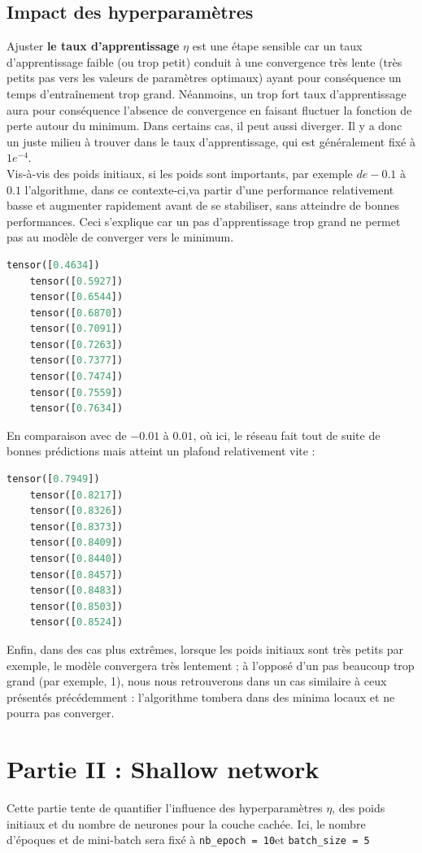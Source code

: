 \documentclass[a4paper]{article}
\newcommand{\code}[2]{\colorbox{light-gray}{\texttt{#1}}}
\begin{document}
	

		\subsection{Impact des hyperparamètres}
	Ajuster \textbf{le taux d'apprentissage} $\eta$ est une étape sensible car un taux d'apprentissage faible (ou trop petit) conduit à une convergence très lente (très petits pas vers les valeurs de paramètres optimaux) ayant pour conséquence un temps d'entraînement trop grand. Néanmoins, un trop fort taux d'apprentissage aura pour conséquence l'absence de convergence en faisant fluctuer la fonction de perte autour du minimum. Dans certains cas, il peut aussi diverger. Il y a donc un juste milieu à trouver dans le taux d'apprentissage, qui est généralement fixé à $1e^{-4}$.\\

Vis-à-vis des poids initiaux, si les poids sont importants, par exemple $de -0.1$ à $0.1$ l'algorithme, dans ce contexte-ci,va partir d'une performance relativement basse et augmenter rapidement avant de se stabiliser, sans atteindre de bonnes performances. Ceci s'explique car un pas d'apprentissage trop grand ne permet pas au modèle de converger vers le minimum. 
		\begin{lstlisting}[language=python]			
	tensor([0.4634])
	tensor([0.5927])
	tensor([0.6544])
	tensor([0.6870])
	tensor([0.7091])
	tensor([0.7263])
	tensor([0.7377])
	tensor([0.7474])
	tensor([0.7559])
	tensor([0.7634])
		\end{lstlisting} 
		
En comparaison avec de $-0.01$ à $0.01$, où ici, le réseau fait tout de suite de bonnes prédictions mais atteint un plafond relativement vite : 
		\begin{lstlisting}[language=python]			
	tensor([0.7949])
	tensor([0.8217])
	tensor([0.8326])
	tensor([0.8373])
	tensor([0.8409])
	tensor([0.8440])
	tensor([0.8457])
	tensor([0.8483])
	tensor([0.8503])
	tensor([0.8524])
		\end{lstlisting} 

Enfin, dans des cas plus extrêmes, lorsque les poids initiaux sont très petits par exemple, le modèle convergera très lentement ; à l'opposé d'un pas beaucoup trop grand (par exemple, 1), nous nous retrouverons dans un cas similaire à ceux présentés précédemment : l'algorithme tombera dans des minima locaux et ne pourra pas converger.


	\section*{Partie II : Shallow network}
	Cette partie tente de quantifier l'influence des hyperparamètres $\eta$, des poids initiaux et du nombre de neurones pour la couche cachée. Ici, le nombre d'époques et de mini-batch sera fixé à \code{nb\_epoch = 10}\ et \code{batch\_size = 5}\.\\
\end{document}
